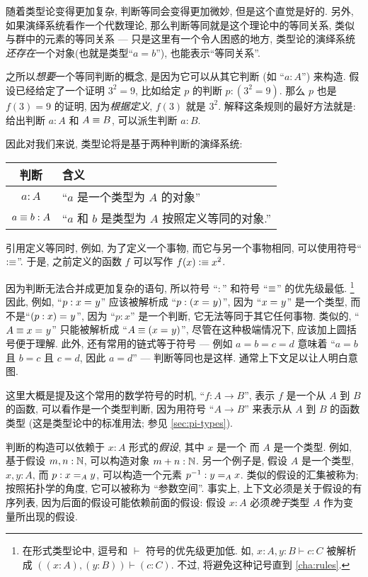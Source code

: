 随着类型论变得更加复杂, 判断等同会变得更加微妙, 但是这个直觉是好的.
另外, 如果演绎系统看作一个代数理论, 那么判断等同就是这个理论中的等同关系, 类似与群中的元素的等同关系 --- 只是这里有一个令人困惑的地方, 类型论的演绎系统\emph{还}\emph{存在}一个对象(也就是类型``$a=b$''), 也能表示``等同关系''.

之所以\emph{想要}一个等同判断的概念, 是因为它可以从其它判断 (如 ``$a:A$'') 来构造.
假设已经给定了一个证明 $3^2=9$, 比如给定 $p$ 的判断 $p:(3^2=9)$. 那么 $p$ 也是 $f(3)=9$ 的证明, 因为\emph{根据定义}, $f(3)$ 就是 $3^2$.
解释这条规则的最好方法就是: 给出判断 $a:A$ 和 $A\jdeq B$, 可以派生判断 $a:B$.

因此对我们来说, 类型论将是基于两种判断的演绎系统:
\begin{center}
    \medskip
    \begin{tabular}{cl}
        \toprule
        判断              & 含义                                \\
        \midrule
        $a : A$         & ``$a$ 是一个类型为 $A$  的对象''             \\
        $a \jdeq b : A$ & ``$a$ 和 $b$ 是类型为 $A$ 按照定义等同的对象.'' \\
        \bottomrule
    \end{tabular}
    \medskip
\end{center}%
%
引用定义等同时, 例如, 为了定义一个事物, 而它与另一个事物相同, 可以使用符号``$\defeq$''.
于是, 之前定义的函数 $f$ 可以写作 $f(x)\defeq x^2$.

因为判断无法合并成更加复杂的语句, 所以符号 ``$:$'' 和符号 ``$\jdeq$'' 的优先级最低.
\footnote{在形式类型论中, 逗号和 $\vdash$ 符号的优先级更加低.
如, $x:A,y:B\vdash c:C$ 被解析成 $((x:A),(y:B))\vdash (c:C)$.
不过, 将避免这种记号直到 \cref{cha:rules}.}
因此, 例如, ``$p:\id{x}{y}$'' 应该被解析成 ``$p:(\id{x}{y})$'', 因为 ``$\id{x}{y}$'' 是一个类型, 而不是``$\id{(p:x)}{y}$'', 因为 ``$p:x$'' 是一个判断, 它无法等同于其它任何事物.
类似的, ``$A\jdeq \id{x}{y}$'' 只能被解析成 ``$A\jdeq(\id{x}{y})$'',  尽管在这种极端情况下, 应该加上圆括号便于理解.
此外, 还有常用的链式等于符号 --- 例如 $a=b=c=d$ 意味着 ``$a=b$ 且 $b=c$ 且 $c=d$, 因此 $a=d$'' --- 判断等同也是这样.
通常上下文足以让人明白意图.

这里大概是提及这个常用的数学符号的时机, ``$f:A\to B$'', 表示 $f$ 是一个从  $A$ 到 $B$ 的函数, 可以看作是一个类型判断, 因为用符号 ``$A\to B$'' 来表示从  $A$ 到 $B$ 的函数类型
(这是类型论中的标准用法;
参见 \cref{sec:pi-types}).

%
判断的构造可以依赖于 $x:A$ 形式的\emph{假设}, 其中 $x$ 是一个 %
而 $A$ 是一个类型.
例如, 基于假设 $m,n : \nat$, 可以构造对象 $m + n : \nat$.
另一个例子是, 假设 $A$ 是一个类型, $x,y : A$, 而  $p : \id[A]{x}{y}$, 可以构造一个元素 $p^{-1} : \id[A]{y}{x}$.
类似的假设的汇集被称为;
按照拓扑学的角度, 它可以被称为 ``参数空间''.
事实上, 上下文必须是关于假设的有序列表, 因为后面的假设可能依赖前面的假设: 假设 $x:A$ 必须\emph{晚于}类型 $A$ 作为变量所出现的假设.

